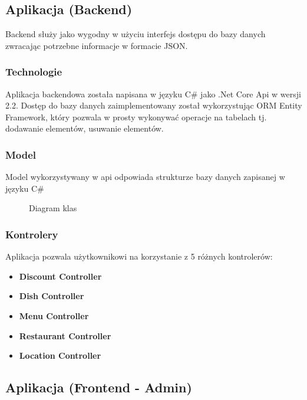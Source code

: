 \documentclass{article}
\begin{document}
	\subsection{Aplikacja (Backend)}
	Backend służy jako wygodny w użyciu interfejs dostępu do bazy danych zwracając potrzebne informacje w formacie JSON.
		\subsubsection{Technologie}
		Aplikacja backendowa została napisana w języku C\# jako .Net Core Api w wersji 2.2. Dostęp do bazy danych zaimplementowany został wykorzystując ORM Entity Framework, który pozwala w prosty wykonywać operacje na tabelach tj. dodawanie elementów, usuwanie elementów.
		\subsubsection{Model}
			Model wykorzystywany w api odpowiada strukturze bazy danych zapisanej w języku C\#
			\begin{figure}
				\centering
				\caption{Diagram klas}
			\end{figure}
		\subsubsection{Kontrolery}
		Aplikacja pozwala użytkownikowi na korzystanie z 5 różnych kontrolerów:
			\begin{itemize}
				\item
					\textbf{Discount Controller} 
				\item
					\textbf{Dish Controller}
				\item
					\textbf{Menu Controller}
				\item
					\textbf{Restaurant Controller}
				\item
					\textbf{Location Controller}
			\end{itemize}
		
	\newpage
	\subsection{Aplikacja (Frontend - Admin)}
\end{document}
